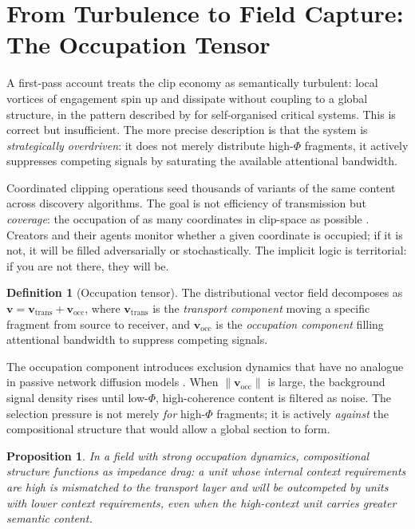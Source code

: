 \documentclass{amsart}
\theoremstyle{plain}
\newtheorem{proposition}[theorem]{Proposition}
\theoremstyle{definition}
\newtheorem{definition}[theorem]{Definition}
\theoremstyle{remark}
\newcommand{\scalar}{\Phi}
\newcommand{\vfield}{\mathbf{v}}
\newcommand{\vtrans}{\mathbf{v}_{\!\text{trans}}}
\newcommand{\vocc}{\mathbf{v}_{\!\text{occ}}}
\begin{document}
\section{From Turbulence to Field Capture: The Occupation Tensor}
\label{sec:overdriven}

A first-pass account treats the clip economy as semantically turbulent: local
vortices of engagement spin up and dissipate without coupling to a global
structure, in the pattern described by \cite{bak1996} for self-organised critical
systems.  This is correct but insufficient.  The more precise description is that
the system is \emph{strategically overdriven}: it does not merely distribute
high-$\scalar$ fragments, it actively suppresses competing signals by saturating
the available attentional bandwidth.

Coordinated clipping operations seed thousands of variants of the same content
across discovery algorithms.  The goal is not efficiency of transmission but
\emph{coverage}: the occupation of as many coordinates in clip-space as possible
\cite{barabasi2016,boyd2010}.  Creators and their agents monitor whether a given
coordinate is occupied; if it is not, it will be filled adversarially or
stochastically.  The implicit logic is territorial: if you are not there, they
will be.

\begin{definition}[Occupation tensor]
  \label{def:occupation}
  The distributional vector field decomposes as $\vfield = \vtrans + \vocc$, where
  $\vtrans$ is the \emph{transport component} moving a specific fragment from
  source to receiver, and $\vocc$ is the \emph{occupation component} filling
  attentional bandwidth to suppress competing signals.
\end{definition}

The occupation component introduces exclusion dynamics that have no analogue in
passive network diffusion models \cite{watts1998,newman2010}.  When $\|\vocc\|$ is
large, the background signal density rises until low-$\scalar$, high-coherence
content is filtered as noise.  The selection pressure is not merely \emph{for}
high-$\scalar$ fragments; it is actively \emph{against} the compositional structure
that would allow a global section to form.

\begin{proposition}
  \label{prop:coherence-drag}
  In a field with strong occupation dynamics, compositional structure functions as
  \emph{impedance drag}: a unit whose internal context requirements are high is
  mismatched to the transport layer and will be outcompeted by units with lower
  context requirements, even when the high-context unit carries greater semantic
  content.
\end{proposition}
\end{document}
